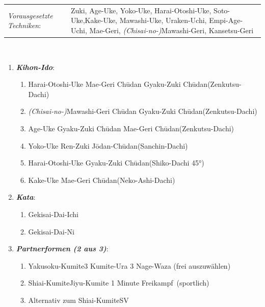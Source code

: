 \documentclass[a5paper,landscape,DIV=calc,11pt,notitlepage]{scrartcl}
\newcommand{\bull}{\,\textbullet\,}
\begin{document}
\pagebreak
\begin{tcolorbox}[colback=white,colframe=GBELT,coltitle=white,title=6. Kyu: Grün]
	\renewcommand{\labelenumi}{\alph{enumi}.)}
	\renewcommand{\labelenumii}{\arabic*.}
	{\scriptsize
		\begin{tabularx}{\textwidth}{lX}
			\textit{Vorausgesetzte Techniken}:& Zuki, Age-Uke, Yoko-Uke, Harai-Otoshi-Uke, Soto-Uke,Kake-Uke, Mawashi-Uke, Uraken-Uchi, Empi-Age-Uchi, Mae-Geri, \textit{(Chisai-no-)}Mawashi-Geri, Kansetsu-Geri
		\end{tabularx}\\}\vspace{12pt}
	\begin{enumerate}[nosep]
		\item \textit{\textbf{Kihon-Ido}}:
		\begin{enumerate}[nosep]
			\item Harai-Otoshi-Uke\bull Mae-Geri Ch\={u}dan\bull Gyaku-Zuki Ch\={u}dan\tabto{280pt}(Zenkutsu-Dachi)
			\item \textit{(Chisai-no-)}Mawashi-Geri Ch\={u}dan\bull Gyaku-Zuki Ch\={u}dan\tabto{280pt}(Zenkutsu-Dachi)
			\item Age-Uke\bull Gyaku-Zuki Ch\={u}dan\bull Mae-Geri Ch\={u}dan\tabto{280pt}(Zenkutsu-Dachi)
			\item Yoko-Uke\bull Ren-Zuki J\={o}dan-Ch\={u}dan\tabto{280pt}(Sanchin-Dachi)
			\item Harai-Otoshi-Uke\bull Gyaku-Zuki Ch\={u}dan\tabto{280pt}(Shiko-Dachi 45°)
			\item Kake-Uke\bull Mae-Geri Ch\={u}dan\tabto{280pt}(Neko-Ashi-Dachi)
		\end{enumerate}\vspace{24pt}
		\item \textit{\textbf{Kata}}:
		\begin{enumerate}[nosep]
			\item Gekisai-Dai-Ichi
			\item Gekisai-Dai-Ni
		\end{enumerate}\vspace{24pt}
		\item \textit{\textbf{Partnerformen (2 aus 3)}}:
		\begin{enumerate}[nosep]
			\item Yakusoku-Kumite\tabto{200pt}3 Kumite-Ura\bull 3 Nage-Waza (frei auszuwählen)
			\item Shiai-Kumite\tabto{200pt}Jiyu-Kumite 1 Minute \frqq Freikampf\flqq~(sportlich)
			\item Alternativ zum Shiai-Kumite\tabto{200pt}SV
		\end{enumerate}
	\end{enumerate}
\end{tcolorbox}
\end{document}
